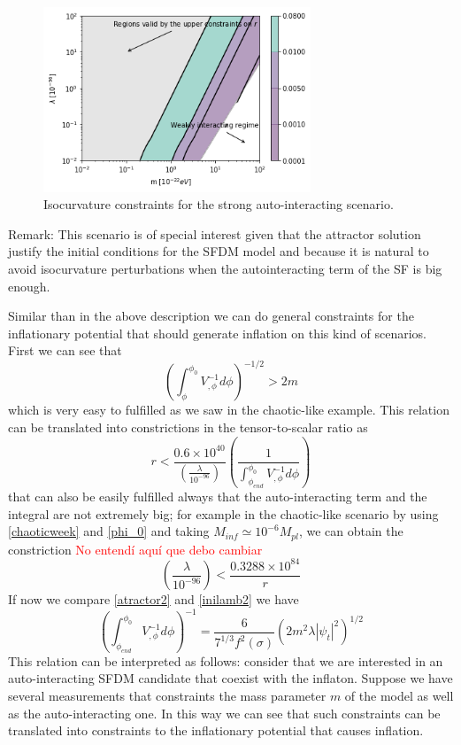 \documentclass[amssymb,twocolumn,prd,nofootinbib,showpacs]{revtex4-1}
\begin{document}
\begin{figure}
\includegraphics[width=8cm]{stronglamb.png}
\caption{Isocurvature constraints for the strong auto-interacting scenario.}\label{constraintsSFDMls}
\end{figure} 

Remark: This scenario is of special interest given that the attractor solution justify the initial conditions for the SFDM model and because it is natural to avoid isocurvature perturbations when the autointeracting term of the SF is big enough. 

Similar than in the above description we can do general constraints for the inflationary potential that should generate inflation on this kind of scenarios. First we can see that
\begin{equation}
\left(\int^{\phi_0}_\phi V_{,\phi}^{-1}d\phi\right)^{-1/2}>2m
\end{equation}
which is very easy to fulfilled as we saw in the chaotic-like example. This relation can be translated into constrictions in the tensor-to-scalar ratio as
\begin{equation}
r<\frac{0.6\times 10^{40}}{\left(\frac{\lambda}{10^{-96}}\right)}\left(\frac{1}{\int_{\phi_{end}}^{\phi_0}V_{,\phi}^{-1}d\phi}\right)
\end{equation}
that can also be easily fulfilled always that the auto-interacting term and the integral are not extremely big; for example in the chaotic-like scenario by using \eqref{chaoticweek} and \eqref{phi_0}
and taking $M_{inf}\simeq 10^{-6}M_{pl} $, we can obtain the constriction \textcolor{red}{No entend\'i aqu\'i que debo cambiar}
\begin{equation}
\left(\frac{\lambda}{10^{-96}}\right)<\frac{0.3288\times 10^{84}}{r}
\end{equation}
If now we compare \eqref{atractor2} and \eqref{inilamb2} we have
\begin{equation}\label{inilamb3}
\left(\int_{\phi_{end}}^{\phi_0}V^{-1}_{,\phi}d\phi\right)^{-1}=\frac{6}{7^{1/3}f^2(\sigma)}\left(2m^2\lambda|\psi_t|^2\right)^{1/2}
\end{equation}
This relation can be interpreted as follows: consider that we are interested in an auto-interacting SFDM candidate that coexist with the inflaton. Suppose we have several measurements that constraints the mass parameter $m$ of the model as well as the auto-interacting one. In this way we can see that such constraints can be translated into constraints to the inflationary potential that causes inflation.  
\end{document}
